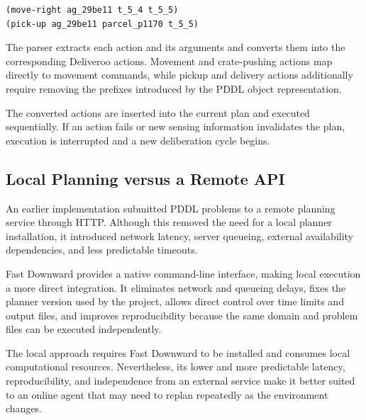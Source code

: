 \documentclass[a4paper]{article}
\begin{document}
\begin{verbatim}
(move-right ag_29be11 t_5_4 t_5_5)
(pick-up ag_29be11 parcel_p1170 t_5_5)
\end{verbatim}

The parser extracts each action and its arguments and converts them into the
corresponding Deliveroo actions. Movement and crate-pushing actions map directly
to movement commands, while pickup and delivery actions additionally require
removing the prefixes introduced by the PDDL object representation.

The converted actions are inserted into the current plan and executed
sequentially. If an action fails or new sensing information invalidates the
plan, execution is interrupted and a new deliberation cycle begins.

\subsection{Local Planning versus a Remote API}

An earlier implementation submitted PDDL problems to a remote planning service
through HTTP. Although this removed the need for a local planner installation,
it introduced network latency, server queueing, external availability
dependencies, and less predictable timeouts.

Fast Downward provides a native command-line interface, making local execution
a more direct integration. It eliminates network and queueing delays, fixes the
planner version used by the project, allows direct control over time limits and
output files, and improves reproducibility because the same domain and problem
files can be executed independently.

The local approach requires Fast Downward to be installed and consumes local
computational resources. Nevertheless, its lower and more predictable latency,
reproducibility, and independence from an external service make it better
suited to an online agent that may need to replan repeatedly as the environment
changes.
\end{document}
